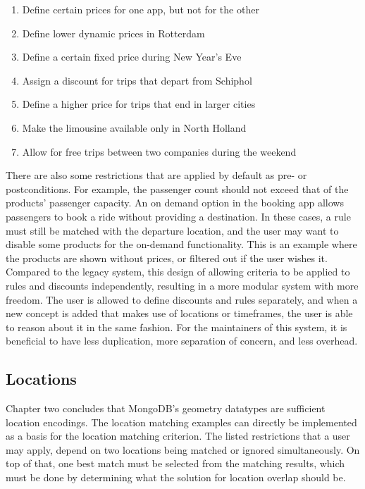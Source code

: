 \begin{enumerate}
	\item Define certain prices for one app, but not for the other
	\item Define lower dynamic prices in Rotterdam
	\item Define a certain fixed price during New Year's Eve
	\item Assign a discount for trips that depart from Schiphol
	\item Define a higher price for trips that end in larger cities
	\item Make the limousine available only in North Holland
	\item Allow for free trips between two companies during the weekend
\end{enumerate}

There are also some restrictions that are applied by default as pre- or  postconditions. For example, the passenger count should not exceed that of the products' passenger capacity. An on demand option in the booking app allows passengers to book a ride without providing a destination. In these cases, a rule must still be matched with the departure location, and the user may want to disable some products for the on-demand functionality. This is an example where the products are shown without prices, or filtered out if the user wishes it. Compared to the legacy system, this design of allowing criteria to be applied to rules and discounts independently, resulting in a more modular system with more freedom. The user is allowed to define discounts and rules separately, and when a new concept is added that makes use of locations or timeframes, the user is able to reason about it in the same fashion. For the maintainers of this system, it is beneficial to have less duplication, more separation of concern, and less overhead.

\subsection{Locations}
Chapter two concludes that MongoDB's geometry datatypes are sufficient location encodings. The location matching examples can directly be implemented as a basis for the location matching criterion. The listed restrictions that a user may apply, depend on two locations being matched or ignored simultaneously. On top of that, one best match must be selected from the matching results, which must be done by determining what the solution for location overlap should be.

